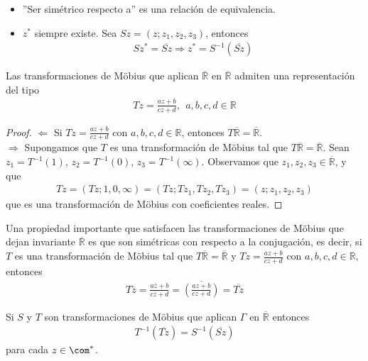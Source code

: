 \begin{obs}
\begin{itemize}
    \item ''Ser simétrico respecto a'' es una relación de equivalencia.
    \item $z^*$ siempre existe. Sea $Sz = (z;z_1,z_2,z_3)$, entonces
    \begin{align*}
        Sz^* = \overline{Sz} \Longrightarrow z^* = S^{-1}(\overline{Sz})
    \end{align*}
\end{itemize}
\end{obs}

\begin{lema}
Las transformaciones de M\"obius que aplican $\overline{\mathbb{R}}$ en $\overline{\mathbb{R}}$ admiten una representación del tipo
\begin{align*}
    Tz = \frac{az + b}{cz + d}, \ \ a,b,c,d \in \mathbb{R}
\end{align*}
\end{lema}

\begin{proof}
$\Longleftarrow$ Si $Tz = \frac{az + b}{cz + d}$ con $a,b,c,d \in \mathbb{R}$, entonces $T\overline{\mathbb{R}} = \overline{\mathbb{R}}$.
\\
\newline
$\Longrightarrow$ Supongamos que $T$ es una transformación de M\"obius tal que $T\overline{\mathbb{R}} = \overline{\mathbb{R}}$. Sean $z_1 = T^{-1}(1)$, $z_2 = T^{-1}(0)$, $z_3 = T^{-1}(\infty)$. Observamos que $z_1,z_2,z_3 \in \overline{\mathbb{R}}$, y que
\begin{align*}
    Tz = (Tz;1,0,\infty) = (Tz;Tz_1, Tz_2, Tz_3) = (z;z_1,z_2,z_3)
\end{align*}
que es una transformación de M\"obius con coeficientes reales.
\end{proof}
Una propiedad importante que satisfacen las transformaciones de M\"obius que dejan invariante $\overline{\mathbb{R}}$ es que son simétricas con respecto a la conjugación, es decir, si $T$ es una transformación de M\"obius tal que $T\overline{\mathbb{R}} = \overline{\mathbb{R}}$ y $Tz = \frac{az + b}{cz + d}$ con $a,b,c,d \in \mathbb{R}$, entonces
\begin{align*}
    T\overline{z} = \frac{a\overline{z} + b}{c\overline{z} + d} = \overline{\left( \frac{az + b}{cz + d} \right)} = \overline{Tz}
\end{align*}
\begin{teo}
Si $S$ y $T$ son transformaciones de M\"obius que aplican $\Gamma$ en $\overline{\mathbb{R}}$ entonces
\begin{align*}
    T^{-1}(\overline{Tz}) = S^{-1}(\overline{Sz})
\end{align*}
para cada $z \in \com^*$.
\end{teo}

